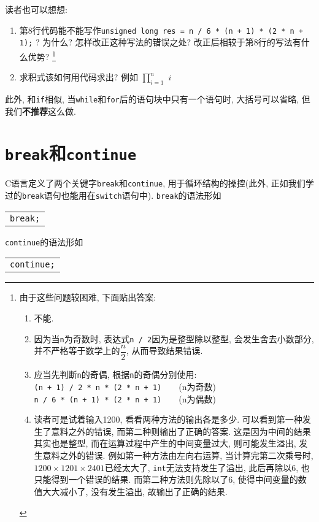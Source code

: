             读者也可以想想:
            \begin{enumerate}
                \item 第8行代码能不能写作\texttt{unsigned long res = n / 6 * (n + 1) * (2 * n + 1);} ? 为什么? 怎样改正这种写法的错误之处? 改正后相较于第8行的写法有什么优势? \footnote{
                    由于这些问题较困难, 下面贴出答案:
                    \begin{enumerate}
                        \item 不能.
                        \item 因为当\texttt{n}为奇数时, 表达式\texttt{n / 2}因为是整型除以整型, 会发生舍去小数部分, 并不严格等于数学上的$\dfrac{n}{2}$, 从而导致结果错误.
                        \item 应当先判断\texttt{n}的奇偶, 根据\texttt{n}的奇偶分别使用: \\
                              \texttt{(n + 1) / 2 * n * (2 * n + 1)}~~~~(n为奇数) \\
                              \texttt{n / 6 * (n + 1) * (2 * n + 1)}~~~~(n为偶数)
                        \item 读者可是试着输入1200, 看看两种方法的输出各是多少. 可以看到第一种发生了意料之外的错误, 而第二种则输出了正确的答案. 这是因为中间的结果其实也是整型, 而在运算过程中产生的中间变量过大, 则可能发生溢出, 发生意料之外的错误. 例如第一种方法由左向右运算, 当计算完第二次乘号时, $1200 \times 1201 \times 2401$已经太大了, \texttt{int}无法支持发生了溢出, 此后再除以6, 也只能得到一个错误的结果. 而第二种方法则先除以了6, 使得中间变量的数值大大减小了, 没有发生溢出, 故输出了正确的结果.
                    \end{enumerate}
                }
                \item 求积式该如何用代码求出? 例如 $\displaystyle \prod ^n _{i = 1}\,\, i$
            \end{enumerate}

            此外, 和\texttt{if}相似, 当\texttt{while}和\texttt{for}后的语句块中只有一个语句时, 大括号可以省略, 但我们\textbf{不推荐}这么做.

    \section{\texttt{break}和\texttt{continue}}
            C语言定义了两个关键字\texttt{break}和\texttt{continue}, 用于循环结构的操控(此外, 正如我们学过的\texttt{break}语句也能用在\texttt{switch}语句中). \texttt{break}的语法形如
            \begin{center}
            \begin{longtable}{l}
                \texttt{break;} 
            \end{longtable}
            \end{center}
            \texttt{continue}的语法形如
            \begin{center}
            \begin{longtable}{l}
                \texttt{continue;} 
            \end{longtable}
            \end{center}

